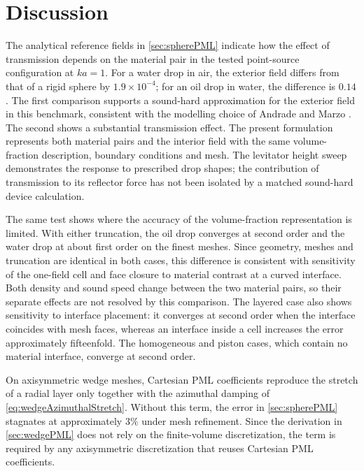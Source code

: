 \documentclass[final,12pt,nopreprintline,longtitle]{elsarticle}
\begin{document}
\FloatBarrier

\section{Discussion}
\label{sec:discussion}

The analytical reference fields in \cref{sec:spherePML} indicate how the
effect of transmission depends on the material pair in the tested
point-source configuration at $ka=1$.  For a water drop in air, the exterior
field differs from that of a rigid sphere by $1.9\times10^{-4}$; for an oil
drop in water, the difference is $0.14$.  The first comparison supports a
sound-hard approximation for the exterior field in this benchmark, consistent
with the modelling choice of Andrade and Marzo \cite{andrade2019numerical}.
The second shows a substantial transmission effect.  The present formulation
represents both material pairs and the interior field with the same
volume-fraction description, boundary conditions and mesh.  The levitator
height sweep demonstrates the response to prescribed drop shapes; the
contribution of transmission to its reflector force has not been isolated by
a matched sound-hard device calculation.

The same test shows where the accuracy of the volume-fraction representation
is limited.  With either truncation, the oil drop converges at second order
and the water drop at about first order on the finest meshes.  Since
geometry, meshes and truncation are identical in both cases, this difference
is consistent with sensitivity of the one-field cell and face closure
to material contrast at a curved interface.  Both density and sound speed
change between the two material pairs, so their separate effects are not
resolved by this comparison.  The layered case also shows sensitivity to
interface placement: it converges at second order when the interface coincides
with mesh faces, whereas an interface inside a cell increases the error
approximately fifteenfold.  The homogeneous and piston cases, which contain
no material interface, converge at second order.

On axisymmetric wedge meshes, Cartesian PML coefficients reproduce the
stretch of a radial layer only together with the azimuthal damping of
\cref{eq:wedgeAzimuthalStretch}.  Without this term, the error in
\cref{sec:spherePML} stagnates at approximately $3\%$ under mesh refinement.
Since the derivation in \cref{sec:wedgePML} does not rely on the
finite-volume discretization, the term is required by any axisymmetric
discretization that reuses Cartesian PML coefficients.
\end{document}
